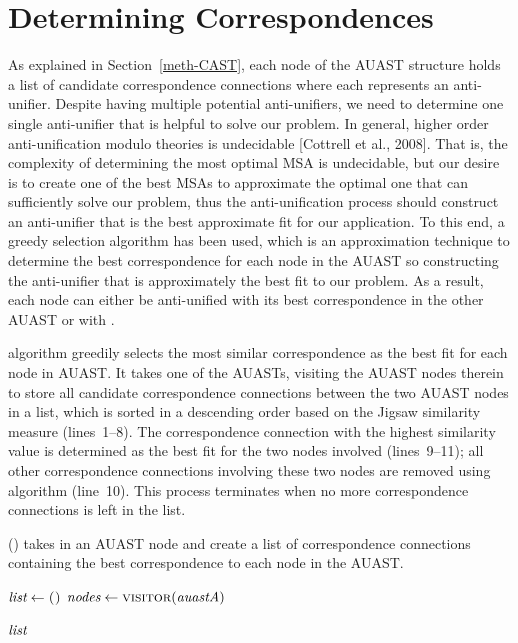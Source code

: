 \section{Determining Correspondences} \label{meth-correspondence}
As explained in Section~\ref{meth-CAST}, each node of the AUAST structure holds a list of candidate correspondence connections where each represents an anti-unifier. Despite having multiple potential anti-unifiers, we need to determine one single anti-unifier that is helpful to solve our problem. In general, higher order anti-unification modulo theories is undecidable [Cottrell et al., 2008]. That is, the complexity of determining the most optimal MSA is undecidable, but our desire is to create one of the best MSAs to approximate the optimal one that can sufficiently solve our problem, thus the anti-unification process should construct an anti-unifier that is the best approximate fit for our application. To this end, a greedy selection algorithm has been used, which is an approximation technique to determine the best correspondence for each node in the AUAST so constructing the anti-unifier that is approximately the best fit to our problem. As a result, each node can either be anti-unified with its best correspondence in the other AUAST or with \nothing.

 algorithm greedily selects the most similar correspondence as the best fit for each node in AUAST. It takes one of the AUASTs, visiting the AUAST nodes therein to store all candidate correspondence connections between the two AUAST nodes in a list, which is sorted in a descending order based on the Jigsaw similarity measure (lines~1--8). The correspondence connection with the highest similarity value is determined as the best fit for the two nodes involved (lines~9--11); all other correspondence connections involving these two nodes are removed using  algorithm (line~10). This process terminates when no more correspondence connections is left in the list.
\begin{algorithm}
\caption{() takes in an AUAST node and create a list of correspondence connections containing the best correspondence to each node in the AUAST.}
\label{alg-determine}
\begin{algorithmic}[1]
\CreateList
    \State $\textit{list} \gets \textsc{()}$
    \State $\textit{nodes} \gets \textsc{visitor}(\textit{auastA})$
	
			 	\EndFor  	
	   \EndFor		
	   \EndFor
 \Return $\textit{list} $  	
  \end{algorithmic}
\end{algorithm}

